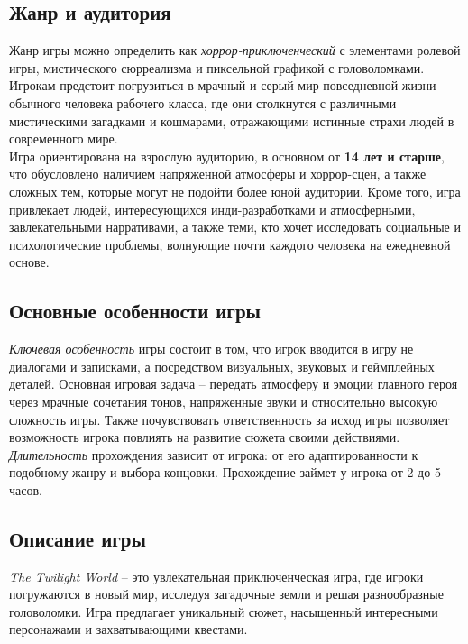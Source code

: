 \documentclass{article}
\begin{document}
	\subsection{Жанр и аудитория}    
	Жанр игры можно определить как \textit{хоррор-приключенческий} с элементами ролевой игры, мистического сюрреализма и пиксельной графикой с головоломками. Игрокам предстоит погрузиться в мрачный и серый мир повседневной жизни обычного человека рабочего класса, где они столкнутся с различными мистическими загадками и кошмарами, отражающими истинные страхи людей в современного мире. \\  
	
	Игра ориентирована на взрослую аудиторию, в основном от \textbf{14 
		лет и старше}, что обусловлено наличием напряженной атмосферы и хоррор-сцен, а также сложных тем, которые могут не подойти более юной аудитории. Кроме того, игра привлекает людей, интересующихся инди-разработками и атмосферными, завлекательными нарративами, а также теми, кто хочет исследовать социальные и психологические проблемы, волнующие почти каждого человека на ежедневной основе. \\
	
	\subsection{Основные особенности игры}
	
	\textit{Ключевая особенность} игры состоит в том, что игрок вводится в игру не диалогами и записками, а посредством визуальных, звуковых и геймплейных деталей. Основная игровая задача -- передать атмосферу и эмоции главного героя через мрачные сочетания тонов, напряженные звуки и относительно высокую сложность игры. Также почувствовать ответственность за исход игры позволяет возможность игрока повлиять на развитие сюжета своими действиями.\\
	
	\textit{Длительность} прохождения зависит от игрока: от его адаптированности к подобному жанру и выбора концовки. Прохождение займет у игрока от 2 до 5 часов.\\
	
	\subsection{Описание игры} 
	
	\textit{The Twilight World} -- это увлекательная приключенческая игра, где игроки погружаются в новый мир, исследуя загадочные земли и решая разнообразные головоломки. Игра предлагает уникальный сюжет, насыщенный интересными персонажами и захватывающими квестами.\\
	
\end{document}

